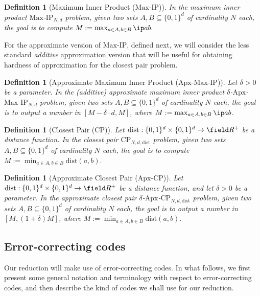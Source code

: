 \documentclass[11pt]{article}
\theoremstyle{plain}
\newtheorem{defn}[thm]{Definition}
\theoremstyle{remark}
\newcommand{\IP}{\mathrm{IP}}
\newcommand{\Max}{\mathrm{Max}}
\newcommand{\CP}{\mathrm{CP}}
\newcommand{\Apx}{\mathrm{Apx}}
\newcommand{\dist}{\mathrm{dist}}
\begin{document}
\begin{defn}[Maximum  Inner Product ($\Max$-$\IP$)] In  the \textsf{maximum inner product $\Max$-$\IP_{N,d}$ problem},
given two sets $A, B\subseteq\{0,1\}^d$
of cardinality $N$ each, the goal is to compute 
$M:=\max_{a \in A, b \in B} \ip a b.$
\end{defn}

For the approximate version of $\Max$-$\IP$, defined next, we will consider the less standard \emph{additive} approximation version that will be useful for obtaining  hardness of approximation  for the closest pair problem.

\begin{defn}[Approximate Maximum Inner Product ($\Apx$-$\Max$-$\IP$)] 
Let $\delta >0$ be a parameter.
In  the \textsf{(additive) approximate maximum inner product $\delta$-$\Apx$-$\Max$-$\IP_{N,d}$ problem},
given two sets $A, B\subseteq\{0,1\}^d$ of cardinality $N$ each, the goal is to output a number in $[M-\delta\cdot d, M]$, where $M:=\max_{a \in A, b \in B} \ip a b$.
\end{defn}

\begin{defn}[Closest Pair ($\CP$)] 
Let $\dist:\{0,1\}^d \times\{0,1\}^d \to\field R^+$ be a distance function. In the \textsf{closest pair  $\CP_{N,d,\dist}$ problem},
given two sets $A, B\subseteq\{0,1\}^d$
of cardinality $N$ each, the goal is to compute 
$M:=\min_{a \in A, b \in B} \dist(a,b).$
\end{defn}


\begin{defn}[Approximate Closest Pair ($\Apx$-$\CP$)] 
Let $\dist:\{0,1\}^d \times\{0,1\}^d \to\field R^+$ be a distance function, and let $\delta>0$ be a parameter. In the \textsf{approximate closest pair  $\delta$-$\Apx$-$\CP_{N,d,\dist}$ problem},
given two sets $A, B\subseteq\{0,1\}^d$
of cardinality $N$ each, the goal is to output a number
in $[M, (1+\delta)M]$, where 
$M:=\min_{a \in A, b \in B} \dist(a,b).$
\end{defn}


\subsection{Error-correcting codes}

Our reduction will make use of error-correcting codes. In what follows, we first present some general notation and terminology with respect to error-correcting codes, and then describe the kind of codes we shall use for our reduction.
\end{document}
